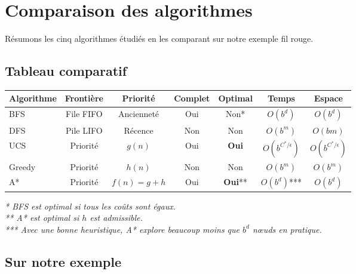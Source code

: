 \documentclass[11pt,a4paper]{article}
\begin{document}
\section{Comparaison des algorithmes}

Résumons les cinq algorithmes étudiés en les comparant sur notre exemple fil rouge.

\subsection{Tableau comparatif}

\begin{center}
\begin{tabular}{|l|c|c|c|c|c|c|}
\hline
\textbf{Algorithme} & \textbf{Frontière} & \textbf{Priorité} & \textbf{Complet} & \textbf{Optimal} & \textbf{Temps} & \textbf{Espace} \\
\hline
BFS & File FIFO & Ancienneté & Oui & Non* & $O(b^d)$ & $O(b^d)$ \\
DFS & Pile LIFO & Récence & Non & Non & $O(b^m)$ & $O(bm)$ \\
UCS & Priorité & $g(n)$ & Oui & \textbf{Oui} & $O(b^{C^*/\epsilon})$ & $O(b^{C^*/\epsilon})$ \\
Greedy & Priorité & $h(n)$ & Non & Non & $O(b^m)$ & $O(b^m)$ \\
A* & Priorité & $f(n) = g + h$ & Oui & \textbf{Oui}** & $O(b^d)$*** & $O(b^d)$ \\
\hline
\end{tabular}
\end{center}

{\small
\textit{* BFS est optimal si tous les coûts sont égaux.}\\
\textit{** A* est optimal si $h$ est admissible.}\\
\textit{*** Avec une bonne heuristique, A* explore beaucoup moins que $b^d$ nœuds en pratique.}
}

\subsection{Sur notre exemple}
\end{document}
